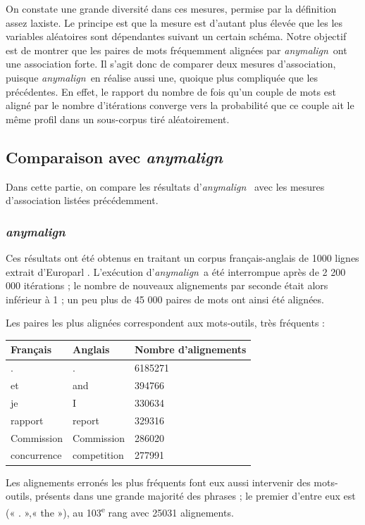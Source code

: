 \documentclass[a4paper,10pt]{article}
\newcommand{\anym}{\emph{anymalign}}
\newcommand{\guill}[1]{« #1 »}
\begin{document}

On constate une grande diversité dans ces mesures, permise par la définition assez laxiste. Le principe est que la mesure est d'autant plus élevée que les les variables aléatoires sont dépendantes suivant un certain schéma. Notre objectif est de montrer que les paires de mots fréquemment alignées par \anym~ont une association forte. Il s'agit donc de comparer deux mesures d'association, puisque \anym~en réalise aussi une, quoique plus compliquée que les précédentes. En effet, le rapport du nombre de fois qu'un couple de mots est aligné par le nombre d'itérations converge vers la probabilité que ce couple ait le même profil dans un sous-corpus tiré aléatoirement.

\subsection{Comparaison avec \anym}

Dans cette partie, on compare les résultats d'\anym~ avec les mesures d'association listées précédemment.

\subsubsection{\anym}

Ces résultats ont été obtenus en traitant un corpus français-anglais de 1000 lignes extrait d'Europarl %
. L'exécution d'\anym~a été interrompue après de 2 200 000 itérations ; le nombre de nouveaux alignements par seconde était alors inférieur à 1 ; un peu plus de 45 000 paires de mots ont ainsi été alignées.

Les paires les plus alignées correspondent aux mots-outils, très fréquents :

\begin{tabular}{|l|l|l|}
\hline
Français & Anglais & Nombre d'alignements \\
\hline
. & . & 6185271 \\
et & and & 394766 \\
je & I & 330634 \\
rapport & report & 329316 \\
Commission & Commission & 286020 \\
concurrence & competition & 277991 \\
\hline
\end{tabular}

Les alignements erronés les plus fréquents font eux aussi intervenir des mots-outils, présents dans une grande majorité des phrases ; le premier d'entre eux est (\guill{.},\guill{the}), au 103\textsuperscript{e} rang avec 25031 alignements.
\end{document}
